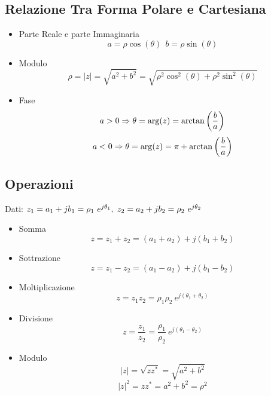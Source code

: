 \subsection{Relazione Tra Forma Polare e Cartesiana}
    \begin{itemize}
        \item {Parte Reale e parte Immaginaria
            \[
                a = \rho \cos(\theta)  \ \ b = \rho \sin(\theta)   
            \]
        }
        \item {Modulo
            \[
                \rho = |z| = \sqrt{a^2+b^2} =\sqrt{\rho^2 \cos^2(\theta) + \rho^2\sin^2(\theta)}
            \]
        }
        \item {Fase
            \[
                 a \\> 0 \Rightarrow \theta = \arg(z) = \arctan\left(\frac{b}{a}\right)
            \]
            \[
                a \\< 0 \Rightarrow \theta = \arg(z) =\pi + \arctan\left(\frac{b}{a}\right) 
            \]

        }
    \end{itemize}


\subsection{Operazioni}
    Dati: $z_1 = a_1 + jb_1 = \rho_1 \ e^{j\theta_1},\hspace{0.1cm} z_2 = a_2 + jb_2 = \rho_2 \ e^{j\theta_2} $
    \begin{itemize}
        \item {Somma
            \[
                z = z_1 + z_2 = (a_1 + a_2) + j(b_1 + b_2)
            \]
        }
        \item {Sottrazione
            \[
                z = z_1 - z_2 = (a_1 - a_2) + j(b_1 - b_2)
            \]
        }
        \item {Moltiplicazione
            \[
                z = z_1 z_2 = \rho_1\rho_2 \ e^{j(\theta_1+\theta_2)}
            \]
        }
        \item {Divisione
            \[
                z = \frac{z_1}{z_2} = \frac{\rho_1}{\rho_2} \ e^{j(\theta_1-\theta_2)}
            \]
        }
        \item {Modulo
            \[
                |z| = \sqrt{zz^*} = \sqrt{a^2+b^2}  
            \]
            \[
                |z|^2 = zz^* = a^2+b^2 = \rho^2
            \]
        }
    \end{itemize}

